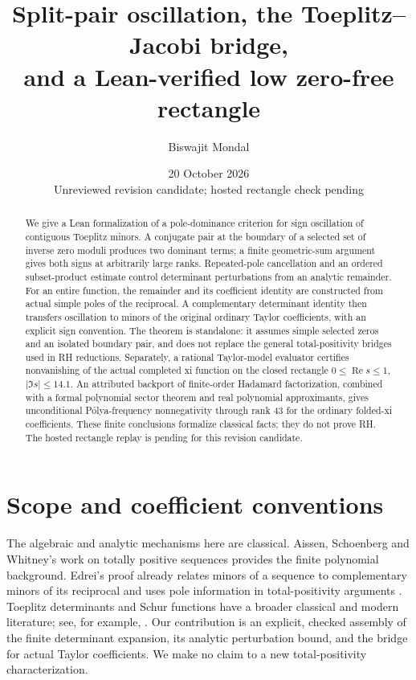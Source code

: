 \documentclass[11pt]{amsart}
\title[Split-pair oscillation and a verified low rectangle]{Split-pair oscillation, the Toeplitz--Jacobi bridge,\\and a Lean-verified low zero-free rectangle}
\author{Biswajit Mondal}
\date{20 October 2026\\Unreviewed revision candidate; hosted rectangle check pending}
\newcommand{\Repart}{\operatorname{Re}}
\begin{document}
\begin{abstract}
We give a Lean formalization of a pole-dominance criterion for sign oscillation of contiguous Toeplitz minors. A conjugate pair at the boundary of a selected set of inverse zero moduli produces two dominant terms; a finite geometric-sum argument gives both signs at arbitrarily large ranks. Repeated-pole cancellation and an ordered subset-product estimate control determinant perturbations from an analytic remainder. For an entire function, the remainder and its coefficient identity are constructed from actual simple poles of the reciprocal. A complementary determinant identity then transfers oscillation to minors of the original ordinary Taylor coefficients, with an explicit sign convention. The theorem is standalone: it assumes simple selected zeros and an isolated boundary pair, and does not replace the general total-positivity bridges used in RH reductions. Separately, a rational Taylor-model evaluator certifies nonvanishing of the actual completed xi function on the closed rectangle $0\le\Repart s\le1$, $|\Im s|\le14.1$. An attributed backport of finite-order Hadamard factorization, combined with a formal polynomial sector theorem and real polynomial approximants, gives unconditional P\'olya-frequency nonnegativity through rank 43 for the ordinary folded-xi coefficients. These finite conclusions formalize classical facts; they do not prove RH. The hosted rectangle replay is pending for this revision candidate.
\end{abstract}
\maketitle

\section{Scope and coefficient conventions}
The algebraic and analytic mechanisms here are classical. Aissen, Schoenberg and Whitney's work on totally positive sequences \cite{asw} provides the finite polynomial background. Edrei's proof already relates minors of a sequence to complementary minors of its reciprocal and uses pole information in total-positivity arguments \cite{edrei}. Toeplitz determinants and Schur functions have a broader classical and modern literature; see, for example, \cite{bumpdiaconis}. Our contribution is an explicit, checked assembly of the finite determinant expansion, its analytic perturbation bound, and the bridge for actual Taylor coefficients. We make no claim to a new total-positivity characterization.
\end{document}
